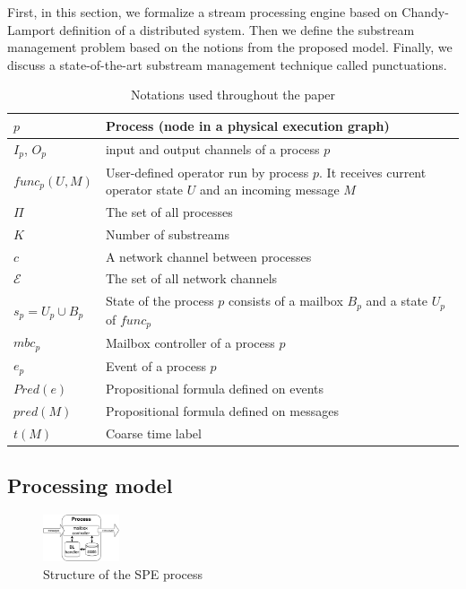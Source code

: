 \label{fs-acker-preliminaries}

First, in this section, we formalize a stream processing engine based on Chandy-Lamport definition of a distributed system. Then we define the substream management problem based on the notions from the proposed model. Finally, we discuss a state-of-the-art substream management technique called punctuations.

\begin{table}[!b]
    \caption{Notations used throughout the paper}
    \footnotesize
    \begin{tabular}{l|p{5cm}}
        \hline
        $p$ & Process (node in a physical execution graph) \\ 
        \hline
        $I_p$, $O_p$ & input and output channels of a process $p$ \\ 
        \hline
        $func_p(U, M)$ & User-defined operator run by process $p$. It receives current operator state $U$ and an incoming message $M$ \\ 
        \hline
        $\Pi$ & The set of all processes  \\
        \hline
        $K$ & Number of substreams  \\
        \hline
        $c$ & A network channel between processes  \\
        \hline
        $\mathcal{E}$ & The set of all network channels  \\
        \hline
        $s_p = U_p \cup B_p$ & State of the process $p$ consists of a mailbox $B_p$ and a state $U_p$ of $func_p$ \\
        \hline
        $mbc_{p}$ & Mailbox controller of a process $p$ \\
        \hline
        $e_{p}$ & Event of a process $p$ \\
        \hline
        $Pred(e)$ & Propositional formula defined on events \\
        \hline
        $pred(M)$ & Propositional formula defined on messages\\
        \hline
        $t(M)$ & Coarse time label \\
    \end{tabular}
    \label{notations}
\end{table}

\subsection{Processing model}

\begin{figure}[htbp]
  \centering
  \includegraphics[width=0.2\textwidth]{pics/process-scheme.pdf}
  \caption{Structure of the SPE process}
  \label{fig:spe_process}
\end{figure}

